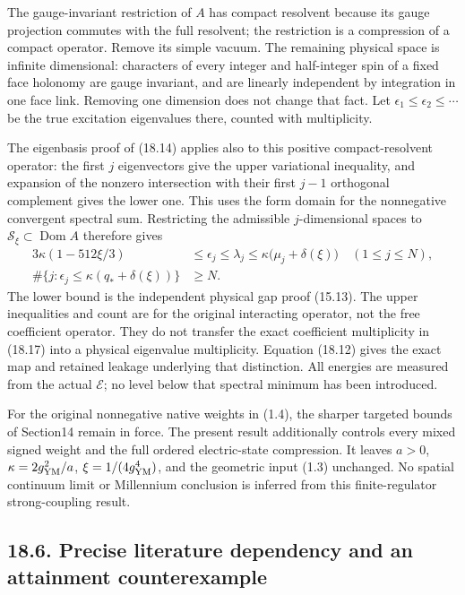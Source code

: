 \documentclass[
]{article}
\begin{document}
The gauge-invariant restriction of \(A\) has compact resolvent because
its gauge projection commutes with the full resolvent; the restriction
is a compression of a compact operator. Remove its simple vacuum. The
remaining physical space is infinite dimensional: characters of every
integer and half-integer spin of a fixed face holonomy are gauge
invariant, and are linearly independent by integration in one face link.
Removing one dimension does not change that fact. Let
\(\epsilon_1\le\epsilon_2\le\cdots\) be the true excitation eigenvalues
there, counted with multiplicity.

The eigenbasis proof of (18.14) applies also to this positive
compact-resolvent operator: the first \(j\) eigenvectors give the upper
variational inequality, and expansion of the nonzero intersection with
their first \(j-1\) orthogonal complement gives the lower one. This uses
the form domain for the nonnegative convergent spectral sum. Restricting
the admissible \(j\)-dimensional spaces to
\(\mathscr S_\xi\subset\operatorname{Dom}A\) therefore gives \[
\begin{split}
3\kappa(1-512\xi/3)&\le\epsilon_j\le\lambda_j
 \le\kappa\bigl(\mu_j+\delta(\xi)\bigr)\quad(1\le j\le N),\\
\#\{j:\epsilon_j\le\kappa(q_*+\delta(\xi))\}&\ge N.
\end{split}                                                   \tag{18.18}
\] The lower bound is the independent physical gap proof (15.13). The
upper inequalities and count are for the original interacting operator,
not the free coefficient operator. They do not transfer the exact
coefficient multiplicity in (18.17) into a physical eigenvalue
multiplicity. Equation (18.12) gives the exact map and retained leakage
underlying that distinction. All energies are measured from the actual
\(\mathcal E\); no level below that spectral minimum has been
introduced.

For the original nonnegative native weights in (1.4), the sharper
targeted bounds of Section14 remain in force. The present result
additionally controls every mixed signed weight and the full ordered
electric-state compression. It leaves \(a>0\),
\(\kappa=2g_{\rm YM}^2/a\), \(\xi=1/(4g_{\rm YM}^4)\), and the geometric
input (1.3) unchanged. No spatial continuum limit or Millennium
conclusion is inferred from this finite-regulator strong-coupling
result.

\subsection{18.6. Precise literature dependency and an attainment
counterexample}\label{precise-literature-dependency-and-an-attainment-counterexample}
\end{document}
